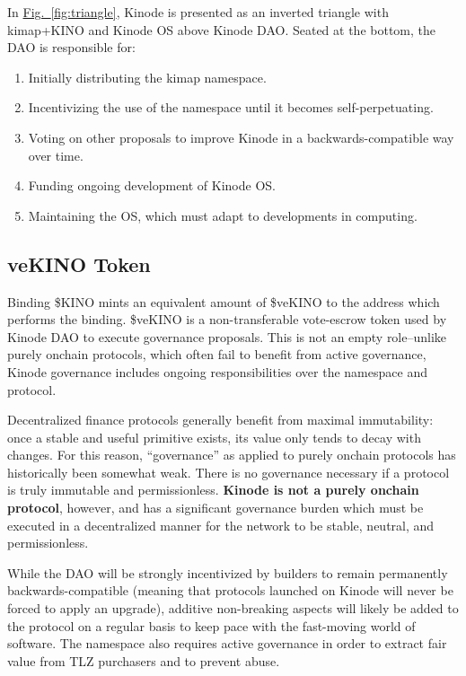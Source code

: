 \documentclass[runningheads]{llncs}
\begin{document}
In \hyperref[fig:triangle]{Fig.~\ref{fig:triangle}}, Kinode is presented as an inverted triangle with kimap+KINO and Kinode OS above Kinode DAO.
Seated at the bottom, the DAO is responsible for:
\begin{enumerate}
    \item Initially distributing the kimap namespace.
    \item Incentivizing the use of the namespace until it becomes self-perpetuating.
    \item Voting on other proposals to improve Kinode in a backwards-compatible way over time.
    \item Funding ongoing development of Kinode OS.
    \item Maintaining the OS, which must adapt to developments in computing.
\end{enumerate}

\subsection{veKINO Token}
\label{sec:daovekino}

Binding \$KINO mints an equivalent amount of \$veKINO to the address which performs the binding.
\$veKINO is a non-transferable vote-escrow token used by Kinode DAO to execute governance proposals.
This is not an empty role–unlike purely onchain protocols, which often fail to benefit from active governance, Kinode governance includes ongoing responsibilities over the namespace and protocol.

Decentralized finance protocols generally benefit from maximal immutability: once a stable and useful primitive exists, its value only tends to decay with changes.
For this reason, ``governance'' as applied to purely onchain protocols has historically been somewhat weak.
There is no governance necessary if a protocol is truly immutable and permissionless. \textbf{Kinode is not a purely onchain protocol}, however, and has a significant governance burden which must be executed in a decentralized manner for the network to be stable, neutral, and permissionless.

While the DAO will be strongly incentivized by builders to remain permanently backwards-compatible (meaning that protocols launched on Kinode will never be forced to apply an upgrade), additive non-breaking aspects will likely be added to the protocol on a regular basis to keep pace with the fast-moving world of software. The namespace also requires active governance in order to extract fair value from TLZ purchasers and to prevent abuse.
\end{document}
